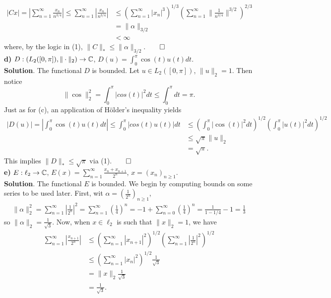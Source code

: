 \documentclass[10pt]{article}
\newcommand{\1}[1]{\mathbbm{1}_{#1}} \newcommand{\mc}[1]{\mathcal{#1}}
\begin{document}
    \begin{align*}
        |Cx|=\left|\sum_{n=1}^\infty\frac{x_n}{n^{3/4}}\right|\leq \sum_{n=1}^\infty\left|\frac{x_n}{n^{3/4}}\right|&\leq\left(\sum_{n=1}^\infty|x_n|^3\right)^{1/3}\left(\sum_{n=1}^\infty\|\frac{1}{n^{3/4}}\|^{3/2}\right)^{2/3}\\
        &=\|\alpha\|_{3/2}\\
        &<\infty
    \end{align*}
    where, by the logic in (1), $\|C\|_\ast\leq \|\alpha\|_{3/2}$.\hfill{$\qed$}\\[5pt]
    {\bf d)} $D:(L_2([0,\pi]),\|\cdot\|_2)\rightarrow\mathbb{C}$, $D(u)=\int_0^\pi\cos(t)u(t)dt$.\\[5pt]
    {\bf Solution}. The functional $D$ is bounded. Let $u\in L_2([0,\pi])$, $\|u\|_2=1$. Then notice
    \[\|\cos\|_2^2=\int_0^\pi|cos(t)|^2dt\leq \int_0^\pi dt=\pi.\]
    Just as for (c), an application of H\"older's inequality yields
    \begin{align*}
        |D(u)|=\left|\int_0^\pi\cos(t)u(t)dt\right|\leq\int_0^\pi|cos(t)u(t)|dt&\leq\left(\int_0^\pi|\cos(t)|^2dt\right)^{1/2}\left(\int_0^\pi |u(t)|^2dt\right)^{1/2}\\
        &\leq\sqrt{\pi}\|u\|_2\\
        &=\sqrt{\pi}. 
    \end{align*}
    This implies $\|D\|_\ast\leq \sqrt{\pi}$ via (1).\hfill{$\qed$}\\[5pt]
    {\bf e)} $E:\ell_2\rightarrow\mathbb{C}$, $E(x)=\sum_{n=1}^\infty\frac{x_n+x_{n+1}}{2^n}$, $x=(x_n)_{n\geq 1}$.\\[5pt]
    {\bf Solution}. The functional $E$ is bounded. We begin by computing bounds on some series to be used later. First, wit $\alpha=(\frac{1}{2^n})_{n\geq 1}$,
    \begin{align*}
        \|\alpha\|_2^2=\sum_{n=1}^\infty\left|\frac{1}{2^n}\right|^2=\sum_{n=1}^\infty\left(\frac{1}{4}\right)^n=-1+\sum_{n=0}^\infty\left(\frac{1}{4}\right)^n=\frac{1}{1-1/4}-1=\frac{1}{3}
    \end{align*}
    so $\|\alpha\|_2=\frac{1}{\sqrt{3}}$. Now, when $x\in\ell_2$ is such that $\|x\|_2=1$, we have
    \begin{align*}
        \sum_{n=1}^\infty\left|\frac{x_{n+1}}{2^n}\right|&\leq \left(\sum_{n=1}^\infty|x_{n+1}|^2\right)^{1/2}\left(\sum_{n=1}^\infty\left|\frac{1}{2^n}\right|^2\right)^{1/2}\\
        &\leq\left(\sum_{n=1}^\infty|x_n|^2\right)^{1/2}\frac{1}{\sqrt{3}}\\
        &=\|x\|_2\frac{1}{\sqrt{3}}\\
        &=\frac{1}{\sqrt{3}}\tag{2}.
    \end{align*}
\end{document}
